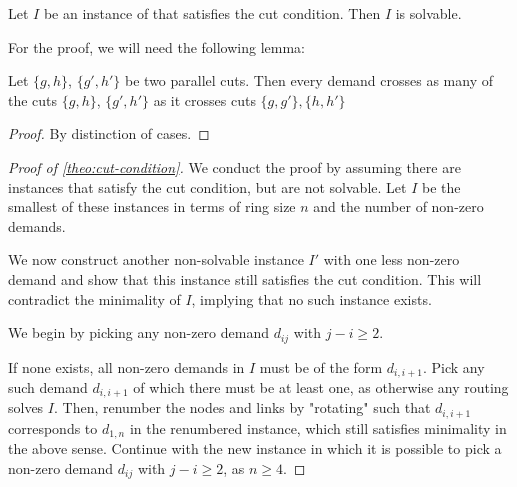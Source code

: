 \begin{theorem}
	\label{theo:cut-condition}
	Let $I$ be an instance of \RRL that satisfies the cut condition.
	Then $I$ is solvable.
\end{theorem}
For the proof, we will need the following lemma:
\begin{lemma}
	\label{lemma:parallel-diagonal-cuts}
	Let $\{g, h\}$, $\{g', h'\}$ be two parallel cuts.
	Then every demand crosses as many of the cuts $\{g, h\}$, $\{g', h'\}$ as it crosses cuts $\{g, g'\}, \{h, h'\}$
\end{lemma}
\begin{proof}
	By distinction of cases.
\end{proof}
\begin{proof}[Proof of \cref{theo:cut-condition}]
	We conduct the proof by assuming there are instances that satisfy the cut condition, but are not solvable.
	Let $I$ be the smallest of these instances in terms of ring size $n$ and the number of non-zero demands.
	
	We now construct another non-solvable instance $I'$ with one less non-zero demand and show that this instance still satisfies the cut condition.
	This will contradict the minimality of $I$, implying that no such instance exists.
	
 	We begin by picking any non-zero demand $d_{ij}$ with $j - i \geq 2$.
	
	If none exists, all non-zero demands in $I$ must be of the form $d_{i, i+1}$.
	Pick any such demand $d_{i, i+1}$ of which there must be at least one, as otherwise any routing solves $I$.
	Then, renumber the nodes and links by "rotating" such that $d_{i, i+1}$ corresponds to $d_{1, n}$ in the renumbered instance, which still satisfies minimality in the above sense.
	Continue with the new instance in which it is possible to pick a non-zero demand $d_{ij}$ with $j - i \geq 2$, as $n \geq 4$.
	

\end{proof}
